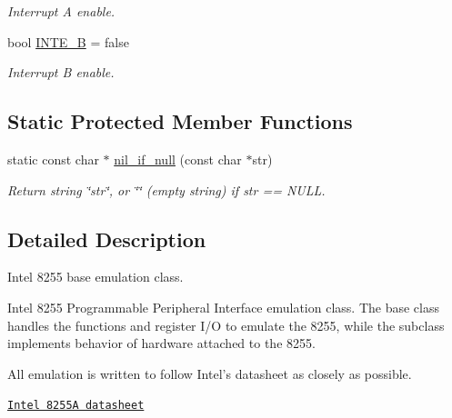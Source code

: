 \begin{DoxyCompactItemize}
\begin{DoxyCompactList}\small\item\em Interrupt A enable. \end{DoxyCompactList}\item 
\hypertarget{classIntel8255_a8417a1099c39abfa19d027e6d341bb7b}{bool \hyperlink{classIntel8255_a8417a1099c39abfa19d027e6d341bb7b}{I\-N\-T\-E\-\_\-\-B} = false}\label{classIntel8255_a8417a1099c39abfa19d027e6d341bb7b}

\begin{DoxyCompactList}\small\item\em Interrupt B enable. \end{DoxyCompactList}\end{DoxyCompactItemize}
\subsection*{Static Protected Member Functions}
\begin{DoxyCompactItemize}
\item 
\hypertarget{classIntel8255_a4d14f0770973a9e416acc5ac04857eb1}{static const char $\ast$ \hyperlink{classIntel8255_a4d14f0770973a9e416acc5ac04857eb1}{nil\-\_\-if\-\_\-null} (const char $\ast$str)}\label{classIntel8255_a4d14f0770973a9e416acc5ac04857eb1}

\begin{DoxyCompactList}\small\item\em Return string \char`\"{}str\char`\"{}, or \char`\"{}\char`\"{} (empty string) if str == N\-U\-L\-L. \end{DoxyCompactList}\end{DoxyCompactItemize}


\subsection{Detailed Description}
Intel 8255 base emulation class. 

Intel 8255 Programmable Peripheral Interface emulation class. The base class handles the functions and register I/\-O to emulate the 8255, while the subclass implements behavior of hardware attached to the 8255.

All emulation is written to follow Intel's datasheet as closely as possible.

\href{http://hackipedia.org/browse/Hardware/By%20company/Intel/8255,%20Programmable%20Peripheral%20Interface/8255A,%208255A-5%20Programmable%20Peripheral%20Interface%20(1991-08).pdf}{\tt Intel 8255\-A datasheet}

